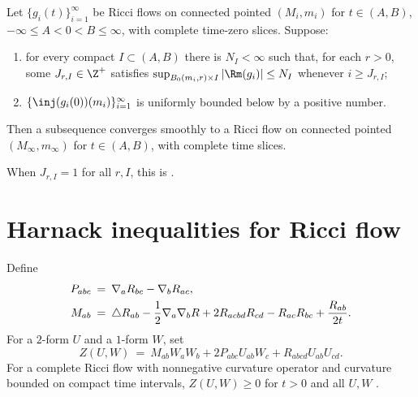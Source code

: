 \begin{corollary}
  \label{cor:kl-convergent-subsequences-ricci-flow-solutions-existence-convergent-subsequences-ricci-flow-solutions-3}
\label{accumulate3}

Let $\{g_i(t)\}_{i=1}^\infty$ be Ricci flows on connected pointed
$(M_i,m_i)$ for $t\in(A,B)$, $-\infty\leq A<0<B\leq\infty$, with complete
time-zero slices. Suppose:
\begin{enumerate}
\item for every compact $I\subset(A,B)$ there is $N_I<\infty$ such that,
for each $r>0$, some $J_{r,I}\in\Z^+$ satisfies
$\sup_{B_0(m_i,r)\times I}|\Rm(g_i)|\leq N_I$ whenever $i\geq J_{r,I}$;
\item $\{\inj(g_i(0))(m_i)\}_{i=1}^\infty$ is uniformly bounded below by a
positive number.
\end{enumerate}
Then a subsequence converges smoothly to a Ricci flow on connected pointed
$(M_\infty,m_\infty)$ for $t\in(A,B)$, with complete time slices.
\end{corollary}

When $J_{r,I}=1$ for all $r,I$, this is
\cite[Main Theorem]{Hamiltonnn}.

\section{Harnack inequalities for Ricci flow} \label{appharnack}

Define
\begin{align}
P_{abc}\: & = \:\nabla_aR_{bc}-\nabla_bR_{ac},\\
M_{ab}\: & = \:\triangle R_{ab}-\frac12\nabla_a\nabla_bR
+2R_{acbd}R_{cd}-R_{ac}R_{bc}+\frac{R_{ab}}{2t}. \notag
\end{align}
For a $2$-form $U$ and a $1$-form $W$, set
\begin{equation}
Z(U,W)\:=\:M_{ab}W_aW_b+2P_{abc}U_{ab}W_c+R_{abcd}U_{ab}U_{cd}.
\end{equation}
For a complete Ricci flow with nonnegative curvature operator and curvature
bounded on compact time intervals, $Z(U,W)\geq0$ for $t>0$ and all $U,W$
\cite[Theorem 14.1]{Hamilton}.

